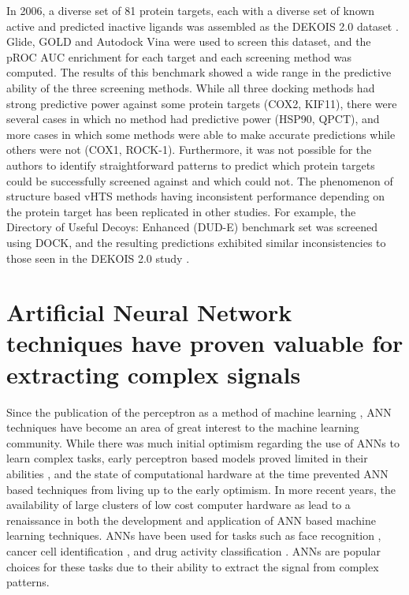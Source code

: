 In 2006, a diverse set of 81 protein targets, each with a diverse set of known active and predicted inactive ligands was assembled as the DEKOIS 2.0 dataset \citep{Bauer:2013de}.
Glide, \ac{GOLD} and Autodock Vina were used to screen this dataset, and the pROC AUC enrichment for each target and each screening method was computed.
The results of this benchmark showed a wide range in the predictive ability of the three screening methods.
While all three docking methods had strong predictive power against some protein targets (COX2, KIF11), there were several cases in which no method had predictive power (HSP90, QPCT), and more cases in which some methods were able to make accurate predictions while others were not (COX1, ROCK-1).
Furthermore, it was not possible for the authors to identify straightforward patterns to predict which protein targets could be successfully screened against and which could not.
The phenomenon of structure based \ac{vHTS} methods having inconsistent performance depending on the protein target has been replicated in other studies.
For example, the Directory of Useful Decoys: Enhanced (DUD-E) benchmark set was screened using DOCK, and the resulting predictions exhibited similar inconsistencies to those seen in the DEKOIS 2.0 study \citep{Mysinger:2012hu}.

\section{Artificial Neural Network techniques have proven valuable for extracting complex signals}

Since the publication of the perceptron as a method of machine learning \citep{Rosenblatt:1958jc}, \ac{ANN} techniques have become an area of great interest to the machine learning community.
While there was much initial optimism regarding the use of \ac{ANN}s to learn complex tasks, early perceptron based models proved limited in their abilities \citep{Gallant:1990hk}, and the state of computational hardware at the time prevented \ac{ANN} based techniques from living up to the early optimism.
In more recent years, the availability of large clusters of low cost computer hardware as lead to a renaissance in both the development and application of \ac{ANN} based machine learning techniques.
\ac{ANN}s have been used for tasks such as face recognition \citep{Zhao:2003bf}, cancer cell identification \citep{Zhou:2002ew}, and drug activity classification \citep{Gohlke:2002in}.
\ac{ANN}s are popular choices for these tasks due to their ability to extract the signal from complex patterns.

